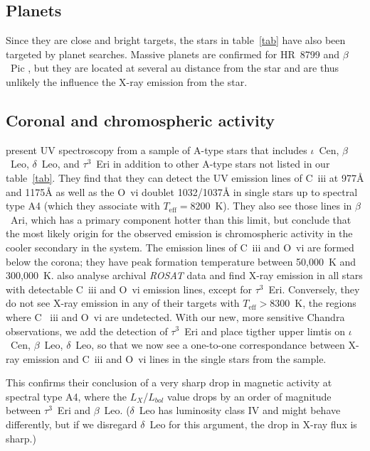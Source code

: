 \documentclass[preprint2]{aastex631}
\begin{document}
\subsection{Planets}
Since they are close and bright targets, the stars in table~\ref{tab}
have also been targeted by planet searches. Massive planets are
confirmed for HR~8799 \citep{2008Sci...322.1348M} and $\beta$~Pic
\citep[e.g.][]{2021AJ....161..179B}, but they are located at several
au distance from the star and are thus unlikely the influence the
X-ray emission from the star.

\subsection{Coronal and chromospheric activity}
\cite{2002ApJ...579..800S} present UV spectroscopy from a sample of
A-type stars that includes $\iota$~Cen, $\beta$~Leo, $\delta$~Leo, and
$\tau^3$~Eri in addition to other A-type stars not listed in our
table~\ref{tab}. They find that they can detect the UV emission lines
of C~{\sc iii} at 977\AA{} and 1175\AA{} as well as the O~{\sc vi}
doublet 1032/1037\AA{} in single stars up to spectral type A4 (which
they associate with $T_\mathrm{eff}=8200$~K). They also see those
lines in $\beta$~Ari, which has a primary component hotter than this
limit, but conclude that the most likely origin for the observed
emission is chromospheric activity in the cooler secondary in the
system. The emission lines of C~{\sc iii} and O~{\sc vi} are formed
below the corona; they have peak formation temperature between
50,000~K and 300,000~K. \cite{2002ApJ...579..800S} also analyse
archival \emph{ROSAT} data and find X-ray emission in all stars with
detectable C~{\sc iii} and O~{\sc vi} emission lines, except for
$\tau^3$~Eri. Conversely, they do not see X-ray emission in any of
their targets with $T_\mathrm{eff}>8300$~K, the regions where C~{\sc
  iii} and O~{\sc vi} are undetected. With our new, more sensitive
Chandra observations, we add the detection of $\tau^3$~Eri and place
tigther upper limtis on $\iota$~Cen, $\beta$~Leo, $\delta$~Leo, so
that we now see a one-to-one correspondance between X-ray emission and
C~{\sc iii} and O~{\sc vi} lines in the single stars from the
\cite{2002ApJ...579..800S} sample.

This confirms their conclusion of a very sharp drop in magnetic
activity at spectral type A4, where the $L_X$/$L_{bol}$ value drops by
an order of magnitude between $\tau^3$~Eri and
$\beta$~Leo. ($\delta$~Leo has luminosity class IV and might behave
differently, but if we disregard $\delta$~Leo for this argument, the
drop in X-ray flux is sharp.)
\end{document}
